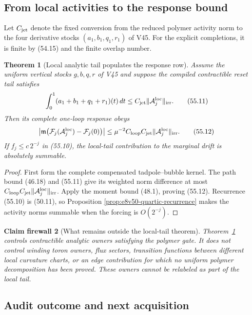 \documentclass[11pt,oneside]{book}
\newtheorem{theorem}{Theorem}[chapter]
\newtheorem{firewall}[theorem]{Claim firewall}
\theoremstyle{definition}
\theoremstyle{remark}
\begin{document}
\subsection{From local activities to the response bound}

Let \(C_{\rm jet}\) denote the fixed conversion from the reduced
polymer activity norm to the four derivative stocks
\((a_1,b_1,q_1,r_1)\) of V45.  For the explicit completions, it is
finite by (54.15) and the finite overlap number.

\begin{theorem}[Local analytic tail populates the response row]
\label{thm:e8v55-local-response}
Assume the uniform vertical stocks \(g,b,q,r\) of V45 and suppose
the compiled contractible reset tail satisfies
\[
 \int_0^1(a_1+b_1+q_1+r_1)(t)\,dt
 \le C_{\rm jet}\|{\cal A}_j^{\rm loc}\|_{\rm irr}.            \tag{55.11}
\]
Then its complete one-loop response obeys
\[
 \left|
 {\mathfrak m}\bigl(
 {\cal F}_j({\cal A}_j^{\rm loc})-{\cal F}_j(0)
 \bigr)\right|
 \le
 \mu^{-2}C_{\rm loop}C_{\rm jet}
 \|{\cal A}_j^{\rm loc}\|_{\rm irr}.                          \tag{55.12}
\]
If \(f_j\le c\,2^{-j}\) in (55.10), the local-tail contribution to
the marginal drift is absolutely summable.
\end{theorem}

\begin{proof}
First form the complete compensated tadpole--bubble kernel.  The
path bound (46.18) and (55.11) give its weighted norm difference at
most
\(C_{\rm loop}C_{\rm jet}\|{\cal A}_j^{\rm loc}\|_{\rm irr}\).
Apply the moment bound (48.1), proving (55.12).  Recurrence
(55.10) is (50.11), so Proposition
\ref{prop:e8v50-quartic-recurrence} makes the activity norms
summable when the forcing is \(O(2^{-j})\).
\end{proof}

\begin{firewall}[What remains outside the local-tail theorem]
\label{fire:e8v55-tail-scope}
Theorem~\ref{thm:e8v55-local-response} controls contractible
analytic owners satisfying the polymer gate.  It does not control
winding toron owners, flux sectors, transition functions between
different local curvature charts, or an edge contribution for
which no uniform polymer decomposition has been proved.  These
owners cannot be relabeled as part of the local tail.
\end{firewall}

\subsection{Audit outcome and next acquisition}
\end{document}
